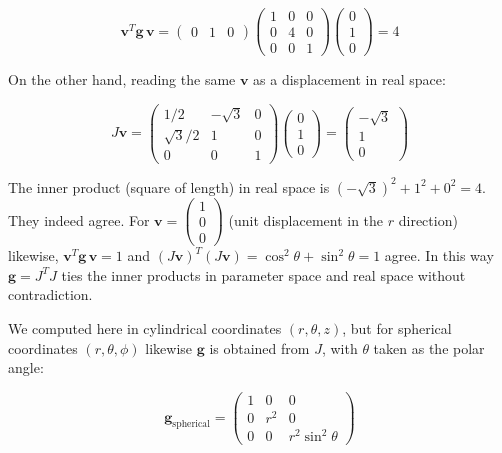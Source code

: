 \[\mathbf{v}^T \mathbf{g} \,\mathbf{v} = \begin{pmatrix} 0 & 1 & 0 \end{pmatrix}
\begin{pmatrix} 1 & 0 & 0 \\ 0 & 4 & 0 \\ 0 & 0 & 1 \end{pmatrix}
\begin{pmatrix} 0 \\ 1 \\ 0 \end{pmatrix} = 4\]

On the other hand, reading the same \(\mathbf{v}\) as a displacement in
real space:

\[J\mathbf{v} = \begin{pmatrix}
1/2 & -\sqrt{3} & 0 \\
\sqrt{3}/2 & 1 & 0 \\
0 & 0 & 1
\end{pmatrix}
\begin{pmatrix} 0 \\ 1 \\ 0 \end{pmatrix} = \begin{pmatrix} -\sqrt{3} \\ 1 \\ 0 \end{pmatrix}\]

The inner product (square of length) in real space is
\((-\sqrt{3})^2 + 1^2 + 0^2 = 4\). They indeed agree. For
\(\mathbf{v} = \begin{pmatrix}1 \\ 0 \\ 0\end{pmatrix}\) (unit
displacement in the \(r\) direction) likewise,
\(\mathbf{v}^T \mathbf{g} \,\mathbf{v} = 1\) and
\((J\mathbf{v})^T (J\mathbf{v}) = \cos^2\theta + \sin^2\theta = 1\)
agree. In this way \(\mathbf{g} = J^T J\) ties the inner products in
parameter space and real space without contradiction.

We computed here in cylindrical coordinates \((r,\theta,z)\), but for
spherical coordinates \((r,\theta,\phi)\) likewise \(\mathbf{g}\) is
obtained from \(J\), with \(\theta\) taken as the polar angle:

\[\mathbf{g}_{\text{spherical}} = \begin{pmatrix} 1 & 0 & 0 \\ 0 & r^2 & 0 \\ 0 & 0 & r^2\sin^2\theta \end{pmatrix}\]


